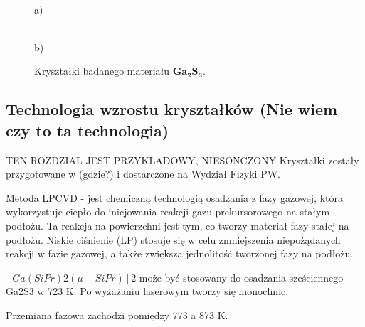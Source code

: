 \begin{figure}[H]
	\begin{minipage}[h]{0.5\linewidth}
		 \\ a) 
	\end{minipage}
	\hfill
	\begin{minipage}[h]{0.5\linewidth}
		 \\b)
	\end{minipage}
	\caption{Kryształki badanego materiału $\mathbf{Ga_{2}S_{3}}$.}
\end{figure}

\subsection{Technologia wzrostu kryształków (Nie wiem czy to ta technologia)}
TEN ROZDZIAL JEST PRZYKLADOWY, NIESONCZONY
Kryształki zostały przygotowane w (gdzie?) i dostarczone na Wydział Fizyki PW. 

Metoda LPCVD - jest chemiczną technologią osadzania z fazy gazowej, która wykorzystuje ciepło do inicjowania reakcji gazu prekursorowego na stałym podłożu. Ta reakcja na powierzchni jest tym, co tworzy materiał fazy stałej na podłożu. Niskie ciśnienie (LP) stosuje się w celu zmniejszenia niepożądanych reakcji w fazie gazowej, a także zwiększa jednolitość tworzonej fazy na podłożu.

$[Ga(SiPr)2(\mu-SiPr)]2$ może być stosowany do osadzania sześciennego Ga2S3 w 723 K. Po wyżażaniu laserowym tworzy się monoclinic.

Przemiana fazowa zachodzi pomiędzy 773 a 873 K. 

























 